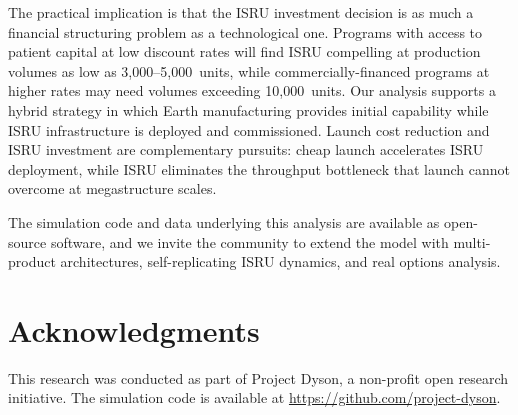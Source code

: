 \documentclass[preprint,12pt]{elsarticle}
\begin{document}
The practical implication is that the ISRU investment decision is as much a financial structuring problem as a technological one. Programs with access to patient capital at low discount rates will find ISRU compelling at production volumes as low as 3{,}000--5{,}000~units, while commercially-financed programs at higher rates may need volumes exceeding 10{,}000~units. Our analysis supports a hybrid strategy in which Earth manufacturing provides initial capability while ISRU infrastructure is deployed and commissioned. Launch cost reduction and ISRU investment are complementary pursuits: cheap launch accelerates ISRU deployment, while ISRU eliminates the throughput bottleneck that launch cannot overcome at megastructure scales.

The simulation code and data underlying this analysis are available as open-source software, and we invite the community to extend the model with multi-product architectures, self-replicating ISRU dynamics, and real options analysis.


\section*{Acknowledgments}

This research was conducted as part of Project Dyson, a non-profit open research initiative. The simulation code is available at \url{https://github.com/project-dyson}.
\end{document}
